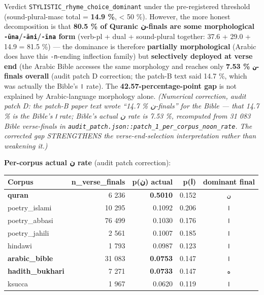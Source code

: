\documentclass[
]{article}
\newcounter{none} %
\begin{document}
Verdict \texttt{STYLISTIC\_rhyme\_choice\_dominant} under the
pre-registered threshold (sound-plural-masc total = \textbf{14.9 \%},
\textless{} 50 \%). However, the more honest decomposition is that
\textbf{80.5 \% of Quranic ن-finals are some morphological
\texttt{-ūna}/\texttt{-āni}/\texttt{-īna} form} (verb-pl + dual +
sound-plural together: 37.6 + 29.0 + 14.9 = 81.5 \%) --- the dominance
is therefore \textbf{partially morphological} (Arabic does have this
\texttt{-n}-ending inflection family) but \textbf{selectively deployed
at verse end} (the Arabic Bible accesses the same morphology and reaches
only \textbf{7.53 \% \texttt{ن}-finals overall} (audit patch D
correction; the patch-B text said 14.7 \%, which was actually the
Bible's \texttt{ا} rate). The \textbf{42.57-percentage-point gap} is not
explained by Arabic-language morphology alone. \emph{(Numerical
correction, audit patch D: the patch-B paper text wrote ``14.7 \%
ن-finals'' for the Bible --- that 14.7 \% is the Bible's \texttt{ا}
rate; Bible's actual ن rate is 7.53 \%, recomputed from 31 083 Bible
verse-finals in
\texttt{audit\_patch.json::patch\_1\_per\_corpus\_noon\_rate}. The
corrected gap STRENGTHENS the verse-end-selection interpretation rather
than weakening it.)}

\textbf{Per-corpus actual ن rate} (audit patch correction):

{\def\LTcaptype{none} %
\begin{longtable}[]{@{}lrrrc@{}}
\toprule\noalign{}
Corpus & n\_verse\_finals & p(ن) actual & p(ا) & dominant final \\
\midrule\noalign{}
\endhead
\bottomrule\noalign{}
\endlastfoot
\textbf{quran} & 6 236 & \textbf{0.5010} & 0.152 & \texttt{ن} \\
poetry\_islami & 10 295 & 0.1092 & 0.206 & \texttt{ا} \\
poetry\_abbasi & 76 499 & 0.1030 & 0.176 & \texttt{ا} \\
poetry\_jahili & 2 561 & 0.1007 & 0.185 & \texttt{ا} \\
hindawi & 1 793 & 0.0987 & 0.123 & \texttt{ا} \\
\textbf{arabic\_bible} & 31 083 & \textbf{0.0753} & 0.147 &
\texttt{ا} \\
\textbf{hadith\_bukhari} & 7 271 & \textbf{0.0733} & 0.147 &
\texttt{ه} \\
ksucca & 1 967 & 0.0620 & 0.119 & \texttt{ا} \\
\end{longtable}
}
\end{document}
